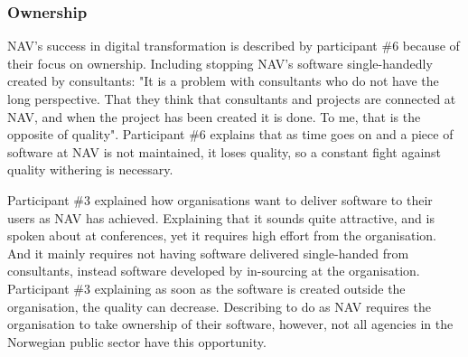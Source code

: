 \subsubsection{Ownership} \label{sec:ownership}
NAV's success in digital transformation is described by participant \#6 because of their focus on ownership. Including stopping NAV's software single-handedly created by consultants: "It is a problem with consultants who do not have the long perspective. That they think that consultants and projects are connected at NAV, and when the project has been created it is done. To me, that is the opposite of quality". Participant \#6 explains that as time goes on and a piece of software at NAV is not maintained, it loses quality, so a constant fight against quality withering is necessary.


Participant \#3 explained how organisations want to deliver software to their users as NAV has achieved. Explaining that it sounds quite attractive, and is spoken about at conferences, yet it requires high effort from the organisation. And it mainly requires not having software delivered single-handed from consultants, instead software developed by in-sourcing at the organisation. Participant \#3 explaining as soon as the software is created outside the organisation, the quality can decrease. Describing to do as NAV requires the organisation to take ownership of their software, however, not all agencies in the Norwegian public sector have this opportunity.


